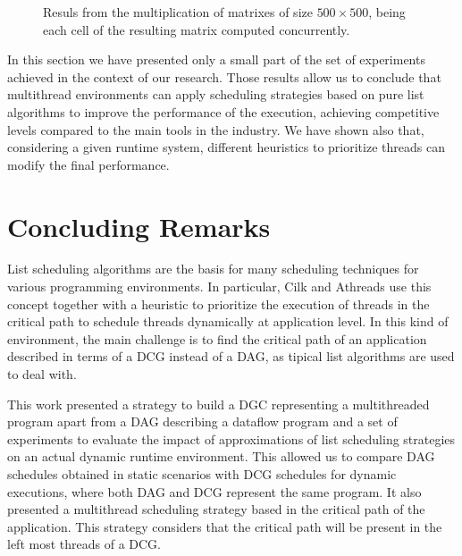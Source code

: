 \documentclass[twocolumn]{svjour3}
\begin{document}
{\begin{figure}
\caption{Resuls from the multiplication of matrixes of size $500 \times 500$, being each cell of the resulting matrix computed concurrently.}
\label{fig:MM}
\end{figure}

In this section we have presented only a small part of the set of experiments achieved in the context of our research. Those results allow us to conclude that multithread environments can apply scheduling strategies based on pure list algorithms to improve the performance of the execution, achieving competitive levels compared to the main tools in the industry. We have shown also that, considering a given runtime system, different heuristics to prioritize threads can modify the final performance.

}

\section{Concluding Remarks}\label{sec:conclusion}

List scheduling algorithms are the basis for many scheduling techniques for various programming environments. In particular, Cilk and Athreads use this concept together with a heuristic to prioritize the execution of threads in the critical path to schedule threads dynamically at application level. In this kind of environment, the main challenge is to find the critical path of an application described in terms of a DCG instead of a DAG, as tipical list algorithms are used to deal with.

This work presented a strategy to build a DGC representing a multithreaded program apart from a DAG describing a dataflow program and a set of experiments to evaluate the impact of approximations of list scheduling strategies on an actual dynamic runtime environment. This allowed us to compare DAG schedules obtained in static scenarios with DCG schedules for dynamic executions, where both DAG and DCG represent the same program. It also presented a multithread scheduling strategy based in the {\color{blue}critical path} of the application. This strategy considers that the {\color{blue}critical path} will be present in the left most threads of a DCG. 
\end{document}
